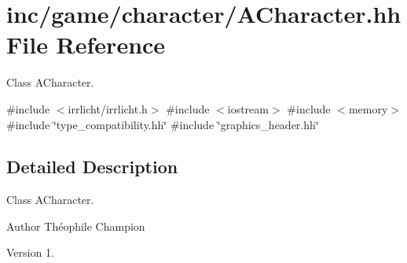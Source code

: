 \hypertarget{ACharacter_8hh}{}\section{inc/game/character/\+A\+Character.hh File Reference}
\label{ACharacter_8hh}


Class A\+Character.  


{\ttfamily \#include $<$irrlicht/irrlicht.\+h$>$}\newline
{\ttfamily \#include $<$iostream$>$}\newline
{\ttfamily \#include $<$memory$>$}\newline
{\ttfamily \#include \char`\"{}type\+\_\+compatibility.\+hh\char`\"{}}\newline
{\ttfamily \#include \char`\"{}graphics\+\_\+header.\+hh\char`\"{}}\newline


\subsection{Detailed Description}
Class A\+Character. 

\begin{DoxyAuthor}{Author}
Théophile Champion 
\end{DoxyAuthor}
\begin{DoxyVersion}{Version}
1. 
\end{DoxyVersion}
